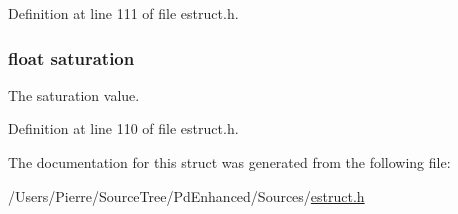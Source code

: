 Definition at line 111 of file estruct.\-h.

\hypertarget{struct__hsl_a953351912fb6da22fde59fe0f24909e7}{
\subsubsection[{saturation}]{\setlength{\rightskip}{0pt plus 5cm}float saturation}}\label{struct__hsl_a953351912fb6da22fde59fe0f24909e7}
The saturation value. 

Definition at line 110 of file estruct.\-h.



The documentation for this struct was generated from the following file\-:\begin{DoxyCompactItemize}
\item 
/\-Users/\-Pierre/\-Source\-Tree/\-Pd\-Enhanced/\-Sources/\hyperlink{estruct_8h}{estruct.\-h}\end{DoxyCompactItemize}
